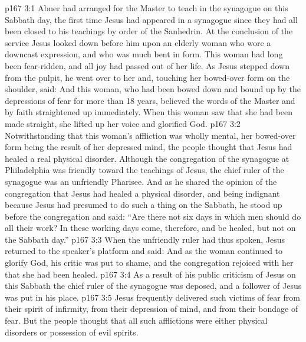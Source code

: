 \vs p167 3:1 Abner had arranged for the Master to teach in the synagogue on this Sabbath day, the first time Jesus had appeared in a synagogue since they had all been closed to his teachings by order of the Sanhedrin. At the conclusion of the service Jesus looked down before him upon an elderly woman who wore a downcast expression, and who was much bent in form. This woman had long been fear\hyp{}ridden, and all joy had passed out of her life. As Jesus stepped down from the pulpit, he went over to her and, touching her bowed\hyp{}over form on the shoulder, said:  And this woman, who had been bowed down and bound up by the depressions of fear for more than 18 years, believed the words of the Master and by faith straightened up immediately. When this woman saw that she had been made straight, she lifted up her voice and glorified God.
\vs p167 3:2 Notwithstanding that this woman’s affliction was wholly mental, her bowed\hyp{}over form being the result of her depressed mind, the people thought that Jesus had healed a real physical disorder. Although the congregation of the synagogue at Philadelphia was friendly toward the teachings of Jesus, the chief ruler of the synagogue was an unfriendly Pharisee. And as he shared the opinion of the congregation that Jesus had healed a physical disorder, and being indignant because Jesus had presumed to do such a thing on the Sabbath, he stood up before the congregation and said: “Are there not six days in which men should do all their work? In these working days come, therefore, and be healed, but not on the Sabbath day.”
\vs p167 3:3 When the unfriendly ruler had thus spoken, Jesus returned to the speaker’s platform and said:  And as the woman continued to glorify God, his critic was put to shame, and the congregation rejoiced with her that she had been healed.
\vs p167 3:4 As a result of his public criticism of Jesus on this Sabbath the chief ruler of the synagogue was deposed, and a follower of Jesus was put in his place.
\vs p167 3:5 \pc Jesus frequently delivered such victims of fear from their spirit of infirmity, from their depression of mind, and from their bondage of fear. But the people thought that all such afflictions were either physical disorders or possession of evil spirits.

